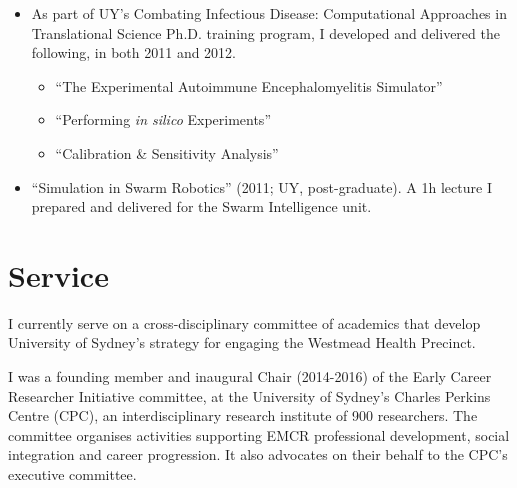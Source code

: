 \documentclass[a4paper]{article}
\begin{document}
\begin{itemize}
\item As part of UY's Combating Infectious Disease: Computational Approaches in Translational Science Ph.D. training program, I developed and delivered the following, in both 2011 and 2012.
 \begin{itemize}
  \item ``The Experimental Autoimmune Encephalomyelitis Simulator''
  \item ``Performing \emph{in silico} Experiments''
  \item ``Calibration \& Sensitivity Analysis''
 \end{itemize}

\item ``Simulation in Swarm Robotics'' (2011; UY, post-graduate). A 1h lecture I prepared and delivered for the Swarm Intelligence unit.
\end{itemize}




\section*{Service}

I currently serve on a cross-disciplinary committee of academics that develop University of Sydney's strategy for engaging the Westmead Health Precinct.

I was a founding member and inaugural Chair (2014-2016) of the Early Career Researcher Initiative committee, at the University of Sydney's Charles Perkins Centre (CPC), an interdisciplinary research institute of 900 researchers. The committee organises activities supporting EMCR professional development, social integration and career progression. It also advocates on their behalf to the CPC's executive committee.
\end{document}
